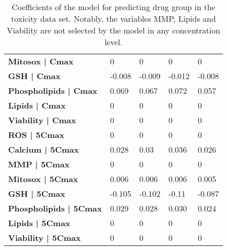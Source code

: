 \begin{table}[hbtp]
{\begin{tabular}{lllll}
\textbf{Mitosox | Cmax}          & 0                                  & 0                                  & 0               & 0               \\
\textbf{GSH | Cmax}              & -0.008                             & -0.009                             & -0.012          & -0.008          \\
\textbf{Phospholipids | Cmax}    & 0.069                              & 0.067                              & 0.072           & 0.057           \\
\textbf{Lipids | Cmax}           & 0                                  & 0                                  & 0               & 0               \\
\textbf{Viability | Cmax}        & 0                                  & 0                                  & 0               & 0               \\
\textbf{ROS | 5Cmax}             & 0                                  & 0                                  & 0               & 0               \\
\textbf{Calcium | 5Cmax}         & 0.028                              & 0.03                               & 0.036           & 0.026           \\
\textbf{MMP | 5Cmax}             & 0                                  & 0                                  & 0               & 0               \\
\textbf{Mitosox | 5Cmax}         & 0.006                              & 0.006                              & 0.006           & 0.005           \\
\textbf{GSH | 5Cmax}             & -0.105                             & -0.102                             & -0.11           & -0.087          \\
\textbf{Phospholipids | 5Cmax}   & 0.029                              & 0.028                              & 0.030           & 0.024           \\
\textbf{Lipids | 5Cmax}          & 0                                  & 0                                  & 0               & 0               \\
\textbf{Viability | 5Cmax}       & 0                                  & 0                                  & 0               & 0               \\ \hline
\end{tabular}}
\caption{Coefficients of the model for predicting drug group in the toxicity data set. Notably, the variables MMP, Lipids and Viability are not selected by the model in any concentration level.}
\label{table:toxicity_results}
\end{table}

